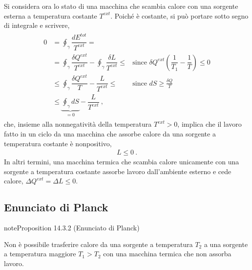 \documentclass[letterpaper,10pt,italian]{jupyterBook}
\begin{document}
\sphinxAtStartPar
Si considera ora lo stato di una macchina che scambia calore con una sorgente esterna a temperatura costante \(T^{ext}\). Poiché è costante, si può portare sotto segno di integrale e scrivere,
\begin{equation*}
\begin{split}\begin{aligned}
  0 & = \oint_{\gamma} \dfrac{d E^{tot}}{T^{ext}} = \\
    & = \oint_{\gamma} \dfrac{\delta Q^{ext}}{T^{ext}} - \oint_{\gamma} \dfrac{\delta L}{T^{ext}} \le & \text{since } \delta Q^{ext} \left(\dfrac{1}{T_1} - \dfrac{1}{T} \right) \le 0 \\
    & \le \oint_{\gamma} \dfrac{\delta Q^{ext}}{T} - \dfrac{L}{T^{ext}} \le & \text{since } dS \ge \frac{\delta Q}{T} \\
    & \le \underbrace{ \oint_{\gamma} d S}_{=0} - \dfrac{L}{T^{ext}} \ , %
\end{aligned}\end{split}
\end{equation*}
\sphinxAtStartPar
che, insieme alla non\sphinxhyphen{}negatività della temperatura \(T^{ext} >0\), implica che il lavoro fatto in un ciclo da una macchina che assorbe calore da una sorgente a temperatura costante è non\sphinxhyphen{}positivo,
\begin{equation*}
\begin{split}L \le 0 \ .\end{split}
\end{equation*}
\sphinxAtStartPar
In altri termini, una macchina termica che scambia calore unicamente con una sorgente a temperatura costante assorbe lavoro dall’ambiente esterno e cede calore, \(\Delta Q^{ext} = \Delta L \le 0\).


\subsection{Enunciato di Planck}
\label{\detokenize{ch/thermodynamics/heat-engine-second-principle:enunciato-di-planck}}\label{\detokenize{ch/thermodynamics/heat-engine-second-principle:physics-hs-thermodynamics-heat-engine-second-principle-planck}}\label{ch/thermodynamics/heat-engine-second-principle:proposition-1}
\begin{sphinxadmonition}{note}{Proposition 14.3.2 (Enunciato di Planck)}



\sphinxAtStartPar
Non è possibile trasferire calore da una sorgente a temperatura \(T_2\) a una sorgente a temperatura maggiore \(T_1 > T_2\) con una macchina termica che non assorba lavoro.
\end{sphinxadmonition}
\end{document}
